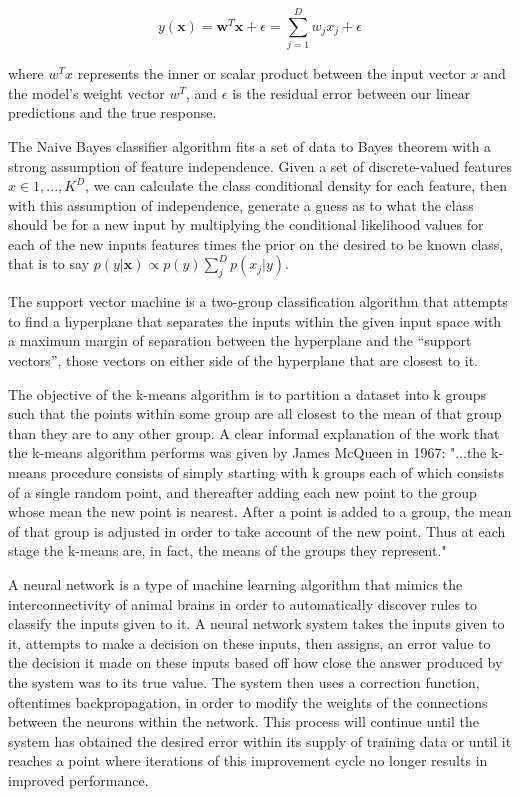 $$ y(\textbf{x}) = \textbf{w}^T\textbf{x} + \epsilon = \sum_{j=1}^{D}w_jx_j + \epsilon $$

where $w^Tx$ represents the inner or scalar product between the input vector $x$
and the model's weight vector $w^T$, and $\epsilon$ is the residual error
between our linear predictions and the true response.

The Naive Bayes classifier algorithm fits a set of data to Bayes theorem with a
strong assumption of feature independence. Given a set of discrete-valued
features $x \in {1,...,K}^D$, we can calculate the class conditional density for
each feature, then with this assumption of independence, generate a guess as to
what the class should be for a new input by multiplying the conditional
likelihood values for each of the new inputs features times the prior on the
desired to be known class, that is to say
$p(y|\textbf{x}) \propto p(y) \sum_{j}^{D}p(x_j|y)$.

The support vector machine is a two-group classification algorithm that attempts
to find a hyperplane that separates the inputs within the given input space
with a maximum margin of separation between the hyperplane and the
``support vectors'', those vectors on either side of the hyperplane that are
closest to it.

The objective of the k-means algorithm is to partition a dataset into k groups
such that the points within some group are all closest to
the mean of that group than they are to any other group. A clear
informal explanation of the work that the k-means algorithm performs
was given by James McQueen in 1967: "...the k-means procedure
consists of simply starting with k groups each of which consists of a
single random point, and thereafter adding each new point to the
group whose mean the new point is nearest. After a point is added to
a group, the mean of that group is adjusted in order to take account
of the new point. Thus at each stage the k-means are, in fact, the
means of the groups they represent."

A neural network is a type of machine learning algorithm that mimics
the interconnectivity of animal brains in order to automatically
discover rules to classify the inputs given to it. A neural network system
takes the inputs given to it, attempts to make a decision on these inputs,
then assigns, an error value to the decision it made on these inputs based off
how close the answer produced by the system was to its true value. The system
then uses a correction function, oftentimes backpropagation, in order to modify
the weights of the connections between the neurons within the network. This
process will continue until the system has obtained the desired error within its
supply of training data or until it reaches a point where iterations of this
improvement cycle no longer results in improved performance.

